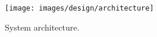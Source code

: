 
\begin{figure}[H]
	\centering
    \texttt{[image: images/design/architecture]}
    \caption[Architecture]{System architecture.}
    \label{fig:architecture}
\end{figure}
